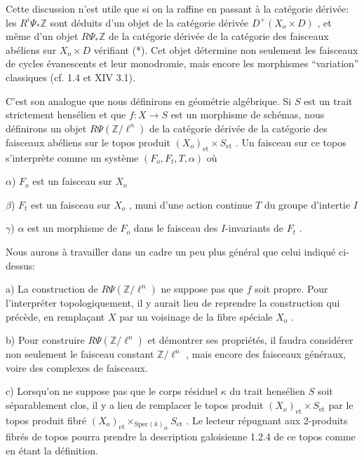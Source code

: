 
Cette discussion n'est utile que si on la raffine en passant à la catégorie dérivée: les $R^i \Psi_* \mathbb{Z}$ sont déduits d'un objet de la catégorie dérivée $D^+(X_o \times D)$ , et même d'un objet $R\Psi_* \mathbb{Z}$ de la catégorie dérivée de la catégorie des faisceaux abéliens sur $X_o \times D$ vérifiant (*). Cet objet détermine non seulement les faisceaux de cycles évanescents et leur monodromie, mais encore les morphismes ``variation'' classiques (cf. 1.4 et XIV 3.1).

C'est son analogue que nous définirons en géométrie algébrique. Si $S$ est un trait strictement hensélien et que $f : X \to S$ est un morphisme de schémas, nous définirons un objet $R\Psi(\mathbb{Z}/\ell^n)$ de la catégorie dérivée de la catégorie des faisceaux abéliens sur le topos produit $(X_o)_{\mathrm{et}} \times S_{\mathrm{et}}$ . Un faisceau sur ce topos s'interprète comme un système $(F_o, F_t, T,\alpha)$ où

$\alpha$)  $F_o$ est un faisceau sur $X_o$

$\beta$)  $F_t$ est un faisceau sur $X_o$ , muni d'une action continue $T$ du groupe d'intertie $I$

$\gamma$)  $\alpha$ est un morphisme de $F_o$ dans le faisceau des $I$-invariants de $F_t$ .

Nous aurons à travailler dans un cadre un peu plus général que celui indiqué ci-dessus:

a)  La construction de $R \Psi( \mathbb{Z} /\ell^n)$ ne suppose pas que $f$ soit propre. Pour l'interpréter topologiquement, il y aurait lieu de reprendre la construction qui précède, en remplaçant $X$ par un voisinage de la fibre spéciale $X_o$ .

b)  Pour construire $R \Psi(\mathbb{Z}/\ell^n)$ et démontrer ses propriétés, il faudra considérer non seulement le faisceau constant $\mathbb{Z}/\ell^n$ , mais encore des faisceaux généraux, voire des complexes de faisceaux.

c)  Lorsqu'on ne suppose pas que le corps résiduel $\kappa$ du trait hensélien $S$ soit séparablement clos, il y a lieu de remplacer le topos produit $(X_o)_{\mathrm{et}} \times S_{\mathrm{et}}$ par le topos produit fibré $(X_o)_{\mathrm{et}} \times_{\mathrm{Spec}(k)_{\mathrm{et}}} S_{\mathrm{et}}$ . Le lecteur répugnant aux 2-produits fibrés de topos pourra prendre la description galoisienne 1.2.4 de ce topos comme en étant la définition.


